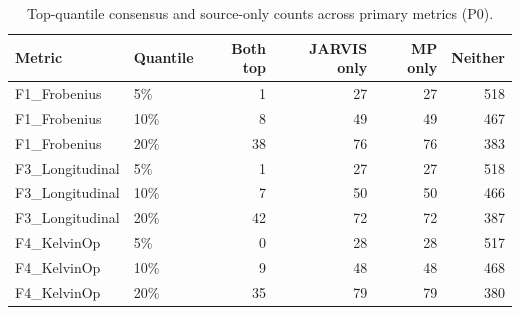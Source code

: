 \begin{table}[t]
\centering
\caption{Top-quantile consensus and source-only counts across primary metrics (P0).}
\label{tab:top_quantile_consensus}
\begin{tabular}{llrrrr}
\toprule
Metric & Quantile & Both top & JARVIS only & MP only & Neither \\
\midrule
F1_Frobenius & 5\% & 1 & 27 & 27 & 518 \\
F1_Frobenius & 10\% & 8 & 49 & 49 & 467 \\
F1_Frobenius & 20\% & 38 & 76 & 76 & 383 \\
F3_Longitudinal & 5\% & 1 & 27 & 27 & 518 \\
F3_Longitudinal & 10\% & 7 & 50 & 50 & 466 \\
F3_Longitudinal & 20\% & 42 & 72 & 72 & 387 \\
F4_KelvinOp & 5\% & 0 & 28 & 28 & 517 \\
F4_KelvinOp & 10\% & 9 & 48 & 48 & 468 \\
F4_KelvinOp & 20\% & 35 & 79 & 79 & 380 \\
\bottomrule
\end{tabular}
\end{table}
